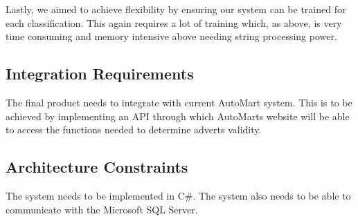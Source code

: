 Lastly, we aimed to achieve flexibility by ensuring our system can be trained for each classification. This again requires a lot of training which, as above, is very time consuming and memory intensive above needing string processing power.

\subsection{Integration Requirements}
The final product needs to integrate with current AutoMart system. This is to be achieved by implementing an API through which AutoMarts website will be able to access the functions needed to determine adverts validity.

\subsection{Architecture Constraints}
The system needs to be implemented in C\#. The system also needs to be able to communicate with the Microsoft SQL Server.